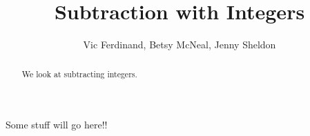 \documentclass{ximera}
\title{Subtraction with Integers}
\author{Vic Ferdinand, Betsy McNeal, Jenny Sheldon}
\begin{document}
\begin{abstract}
We look at subtracting integers.
\end{abstract}
\maketitle

Some stuff will go here!!
\end{document}
